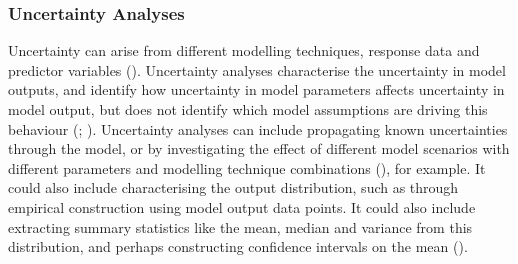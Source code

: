 \documentclass[
]{article}
\begin{document}
\subsubsection{Uncertainty Analyses}\label{uncertainty-analyses}

\begin{tcolorbox}[enhanced jigsaw, opacitybacktitle=0.6, bottomrule=.15mm, leftrule=.75mm, rightrule=.15mm, colbacktitle=quarto-callout-note-color!10!white, toprule=.15mm, titlerule=0mm, left=2mm, colframe=quarto-callout-note-color-frame, breakable, title=\textcolor{quarto-callout-note-color}{\faInfo}\hspace{0.5em}{Explanation}, opacityback=0, coltitle=black, bottomtitle=1mm, colback=white, toptitle=1mm, arc=.35mm]

Uncertainty can arise from different modelling techniques, response data
and predictor variables (). Uncertainty analyses characterise the uncertainty in model
outputs, and identify how uncertainty in model parameters affects
uncertainty in model output, but does not identify which model
assumptions are driving this behaviour
(;
). Uncertainty
analyses can include propagating known uncertainties through the model,
or by investigating the effect of different model scenarios with
different parameters and modelling technique combinations
(), for example. It could
also include characterising the output distribution, such as through
empirical construction using model output data points. It could also
include extracting summary statistics like the mean, median and variance
from this distribution, and perhaps constructing confidence intervals on
the mean ().

\end{tcolorbox}
\end{document}
